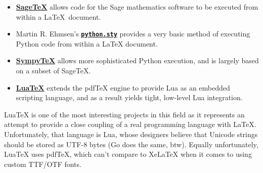 \begin{itemize}
\item
  \href{http://www.ctan.org/tex-archive/macros/latex/contrib/sagetex}{\textbf{SageTeX}}
  allows code for the Sage mathematics software to be executed from
  within a \LaTeX~document.
\item
  Martin R. Ehmsen's
  \href{http://www.ctan.org/pkg/python}{\textbf{\texttt{python.sty}}}
  provides a very basic method of executing Python code from within a
  LaTeX document.
\item
  \href{http://elec.otago.ac.nz/w/index.php/SympyTeX}{\textbf{SympyTeX}}
  allows more sophisticated Python execution, and is largely based on a
  subset of SageTeX.
\item
  \href{http://www.luatex.org/}{\textbf{LuaTeX}} extends the pdfTeX
  engine to provide Lua as an embedded scripting language, and as a
  result yields tight, low-level Lua integration.
\end{itemize}

LuaTeX is one of the most interesting projects in this field as it
represents an attempt to provide a close coupling of a real programming
language with LaTeX. Unfortunately, that language is Lua, whose
designers believe that Unicode strings should be stored as UTF-8 bytes
(Go does the same, btw). Equally unfortunately, LuaTeX uses pdfTeX,
which can't compare to XeLaTeX when it comes to using custom TTF/OTF
fonts.
